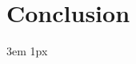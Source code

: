 \documentclass{Academic}
\begin{document}
    \section{Conclusion}

    \singlespacing
    \emergencystretch 3em
    \hfuzz 1px
    \printbibliography[heading=bibnumbered]




\end{document}
